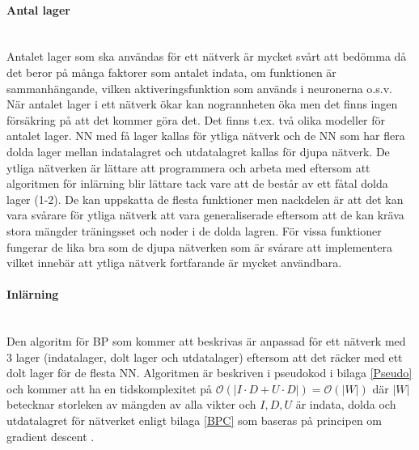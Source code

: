 \documentclass[a4paper,10pt]{article}
\begin{document}
\paragraph{Antal lager}\hspace{0pt}\\
Antalet lager som ska användas för ett nätverk är mycket svårt att bedömma då det beror på många faktorer som antalet indata, om funktionen är sammanhängande, vilken aktiveringsfunktion som används i neuronerna o.s.v. När antalet lager i ett nätverk ökar kan nogrannheten öka men det finns ingen försäkring på att det kommer göra det. Det finns t.ex. två olika modeller för antalet lager. NN med få lager kallas för ytliga nätverk och de NN som har flera dolda lager mellan indatalagret och utdatalagret kallas för djupa nätverk\autocite{DL}. De ytliga nätverken är lättare att programmera och arbeta med eftersom att algoritmen för inlärning blir lättare tack vare att de består av ett fåtal dolda lager (1-2). De kan uppskatta de flesta funktioner\autocite{SLA} men nackdelen är att det kan vara svårare för ytliga nätverk att vara generaliserade eftersom att de kan kräva stora mängder träningsset och noder i de dolda lagren. För vissa funktioner fungerar de lika bra som de djupa nätverken som är svårare att implementera\autocite{SLA} vilket innebär att ytliga nätverk fortfarande är mycket användbara.  

\paragraph{Inlärning}\hspace{0pt}\\
Den algoritm för BP som kommer att beskrivas är anpassad för ett nätverk med 3 lager (indatalager, dolt lager och utdatalager) eftersom att det räcker med ett dolt lager för de flesta NN.\autocite{StackExchange}\autocite{SLA}  Algoritmen är beskriven i pseudokod i bilaga \ref{Pseudo} och kommer att ha en tidskomplexitet på $\mathcal{O}(|I\cdot D+U\cdot D|) = \mathcal{O}(|W|)$ där $|W|$ betecknar storleken av mängden av alla vikter och $I,D,U$ är indata, dolda och utdatalagret för nätverket enligt bilaga \ref{BPC} som baseras på principen om gradient descent \autocite{GD}.
\end{document}
